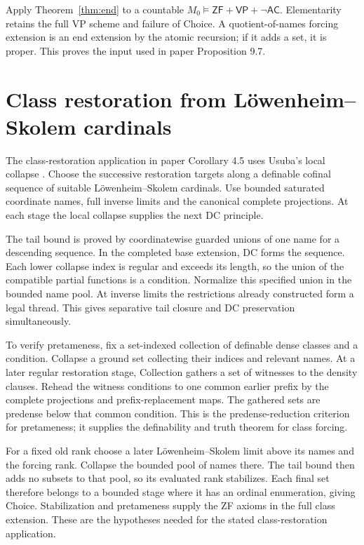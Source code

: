 \documentclass[11pt,a4paper]{amsart}
\newcommand{\ZF}{\ensuremath{\mathsf{ZF}}}
\newcommand{\AC}{\ensuremath{\mathsf{AC}}}
\newcommand{\VP}{\ensuremath{\mathsf{VP}}}
\begin{document}
Apply Theorem~\ref{thm:end} to a countable $M_0\models\ZF+\VP+\neg\AC$. Elementarity retains the full VP scheme and failure of Choice. A quotient-of-names forcing extension is an end extension by the atomic recursion; if it adds a set, it is proper. This proves the input used in paper Proposition 9.7.

\section{Class restoration from L\"owenheim--Skolem cardinals}
The class-restoration application in paper Corollary 4.5 uses Usuba's local collapse \cite{Usuba}. Choose the successive restoration targets along a definable cofinal sequence of suitable L\"owenheim--Skolem cardinals. Use bounded saturated coordinate names, full inverse limits and the canonical complete projections. At each stage the local collapse supplies the next DC principle.

The tail bound is proved by coordinatewise guarded unions of one name for a descending sequence. In the completed base extension, DC forms the sequence. Each lower collapse index is regular and exceeds its length, so the union of the compatible partial functions is a condition. Normalize this specified union in the bounded name pool. At inverse limits the restrictions already constructed form a legal thread. This gives separative tail closure and DC preservation simultaneously.

To verify pretameness, fix a set-indexed collection of definable dense classes and a condition. Collapse a ground set collecting their indices and relevant names. At a later regular restoration stage, Collection gathers a set of witnesses to the density clauses. Rehead the witness conditions to one common earlier prefix by the complete projections and prefix-replacement maps. The gathered sets are predense below that common condition. This is the predense-reduction criterion for pretameness; it supplies the definability and truth theorem for class forcing.

For a fixed old rank choose a later L\"owenheim--Skolem limit above its names and the forcing rank. Collapse the bounded pool of names there. The tail bound then adds no subsets to that pool, so its evaluated rank stabilizes. Each final set therefore belongs to a bounded stage where it has an ordinal enumeration, giving Choice. Stabilization and pretameness supply the ZF axioms in the full class extension. These are the hypotheses needed for the stated class-restoration application.
\end{document}
